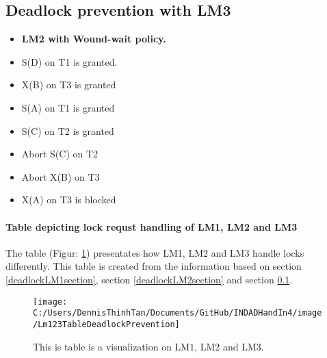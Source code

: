 \subsection{Deadlock prevention with LM3} \label{deadlockLM3section}

\begin{itemize}
	\item{\textbf{LM2 with Wound-wait policy.}}
	\item S(D) on T1 is granted.
	\item X(B) on T3 is granted
	\item S(A) on T1 is granted
	\item S(C) on T2 is granted
	\item Abort S(C) on T2
	\item Abort X(B) on T3
	\item X(A) on T3 is blocked
\end{itemize}
\pagebreak
\paragraph{Table depicting lock requst handling of LM1, LM2 and LM3}
The table (Figur: \ref{fig:Lm123TableDeadlockPrevention}) presentates how LM1, LM2 and LM3 handle locks differently. This table is created from the information based on section \ref{deadlockLM1section}, section \ref{deadlockLM2section} and section \ref{deadlockLM3section}.
\begin{figure}[H]
\centering
\texttt{[image: C:/Users/DennisThinhTan/Documents/GitHub/INDADHandIn4/image/Lm123TableDeadlockPrevention]}
\caption{This is table is a visualization on LM1, LM2 and LM3.}
\label{fig:Lm123TableDeadlockPrevention}
\end{figure}
